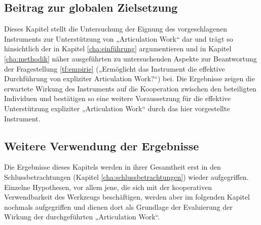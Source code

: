 \subsection{Beitrag zur globalen Zielsetzung}

Dieses Kapitel stellt die Untersuchung der Eignung des vorgeschlagenen Instruments zur Unterstützung von „Articulation Work“ dar und trägt so hinsichtlich der in Kapitel \ref{cha:einführung} argumentieren und in Kapitel \ref{cha:methodik} näher ausgeführten zu untersuchenden Aspekte zur Beantwortung der Fragestellung \ref{tf:empirie} („Ermöglicht das Instrument die effektive Durchführung von expliziter Articulation Work?“) bei. Die Ergebnisse zeigen die erwartete Wirkung des Instruments auf die Kooperation zwischen den beteiligten Individuen und bestätigen so eine weitere Voraussetzung für die effektive Unterstützung expliziter „Articulation Work“ durch das hier vorgestellte Instrument.

\subsection{Weitere Verwendung der Ergebnisse}

Die Ergebnisse dieses Kapitels werden in ihrer Gesamtheit erst in den Schlussbetrachtungen (Kapitel \ref{cha:schlussbetrachtungen}) wieder aufgegriffen. Einzelne Hypothesen, vor allem jene, die sich mit der kooperativen Verwendbarkeit des Werkzeugs beschäftigen, werden aber im folgenden Kapitel nochmals aufgegriffen und dienen dort als Grundlage der Evaluierung der Wirkung der durchgeführten „Articulation Work“.
